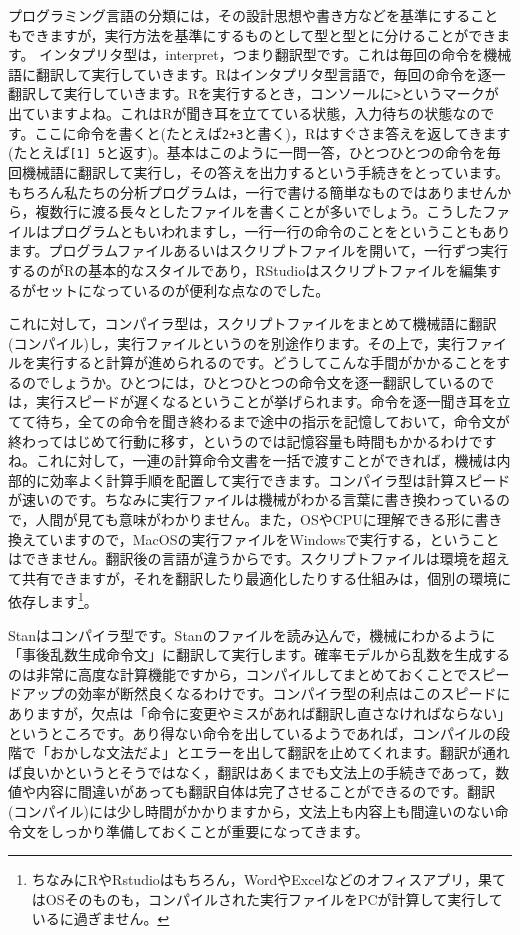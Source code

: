 \documentclass{ltjsbook}
\begin{document}
プログラミング言語の分類には，その設計思想や書き方などを基準にすることもできますが，実行方法を基準にするものとして型と型とに分けることができます。
インタプリタ型は，interpret，つまり翻訳型です。これは毎回の命令を機械語に翻訳して実行していきます。Rはインタプリタ型言語で，毎回の命令を逐一翻訳して実行していきます。Rを実行するとき，コンソールに\verb|>|というマークが出ていますよね。これはRが聞き耳を立てている状態，入力待ちの状態なのです。ここに命令を書くと(たとえば\verb|2+3|と書く)，Rはすぐさま答えを返してきます(たとえば\verb|[1] 5|と返す)。基本はこのように一問一答，ひとつひとつの命令を毎回機械語に翻訳して実行し，その答えを出力するという手続きをとっています。もちろん私たちの分析プログラムは，一行で書ける簡単なものではありませんから，複数行に渡る長々としたファイルを書くことが多いでしょう。こうしたファイルはプログラムともいわれますし，一行一行の命令のことをということもあります。プログラムファイルあるいはスクリプトファイルを開いて，一行ずつ実行するのがRの基本的なスタイルであり，RStudioはスクリプトファイルを編集するがセットになっているのが便利な点なのでした。

これに対して，コンパイラ型は，スクリプトファイルをまとめて機械語に翻訳(コンパイル)し，実行ファイルというのを別途作ります。その上で，実行ファイルを実行すると計算が進められるのです。どうしてこんな手間がかかることをするのでしょうか。ひとつには，ひとつひとつの命令文を逐一翻訳しているのでは，実行スピードが遅くなるということが挙げられます。命令を逐一聞き耳を立てて待ち，全ての命令を聞き終わるまで途中の指示を記憶しておいて，命令文が終わってはじめて行動に移す，というのでは記憶容量も時間もかかるわけですね。これに対して，一連の計算命令文書を一括で渡すことができれば，機械は内部的に効率よく計算手順を配置して実行できます。コンパイラ型は計算スピードが速いのです。ちなみに実行ファイルは機械がわかる言葉に書き換わっているので，人間が見ても意味がわかりません。また，OSやCPUに理解できる形に書き換えていますので，MacOSの実行ファイルをWindowsで実行する，ということはできません。翻訳後の言語が違うからです。スクリプトファイルは環境を超えて共有できますが，それを翻訳したり最適化したりする仕組みは，個別の環境に依存します\footnote{ちなみにRやRstudioはもちろん，WordやExcelなどのオフィスアプリ，果てはOSそのものも，コンパイルされた実行ファイルをPCが計算して実行しているに過ぎません。}。

Stanはコンパイラ型です。Stanのファイルを読み込んで，機械にわかるように「事後乱数生成命令文」に翻訳して実行します。確率モデルから乱数を生成するのは非常に高度な計算機能ですから，コンパイルしてまとめておくことでスピードアップの効率が断然良くなるわけです。コンパイラ型の利点はこのスピードにありますが，欠点は「命令に変更やミスがあれば翻訳し直さなければならない」というところです。あり得ない命令を出しているようであれば，コンパイルの段階で「おかしな文法だよ」とエラーを出して翻訳を止めてくれます。翻訳が通れば良いかというとそうではなく，翻訳はあくまでも文法上の手続きであって，数値や内容に間違いがあっても翻訳自体は完了させることができるのです。翻訳(コンパイル)には少し時間がかかりますから，文法上も内容上も間違いのない命令文をしっかり準備しておくことが重要になってきます。
\end{document}
